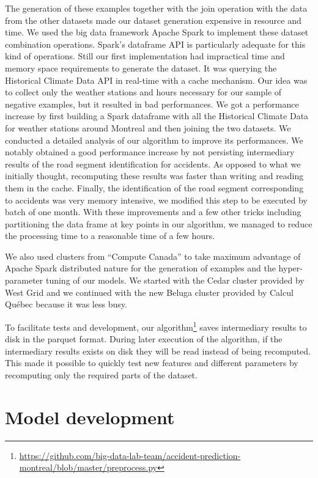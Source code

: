 \documentclass[conference]{IEEEtran}
\begin{document}
The generation of these examples together with the
join operation with the data from the other datasets made our dataset
generation expensive in resource and time. We used the big data framework
Apache Spark \cite{Zaharia2016} to implement these dataset combination
operations. Spark's dataframe API is particularly adequate
for this kind of operations. Still our first implementation had impractical
time and memory space requirements to generate the dataset. It was querying
the Historical Climate Data API in real-time with a cache mechanism. Our
idea was to collect only the weather stations and hours necessary for our
sample of negative examples, but it resulted in bad performances. We got a
performance increase by first building a Spark dataframe with all the
Historical Climate Data for weather stations around Montreal and then
joining the two datasets. We conducted a detailed analysis of our algorithm
to improve its performances. We notably obtained a good performance
increase by not persisting intermediary results of the road segment
identification for accidents. As opposed to what we initially thought,
recomputing these results was faster than writing and reading them in the
cache. Finally, the identification of the road segment corresponding to
accidents was very memory intensive, we modified this step to be executed
by batch of one month. With these improvements and a few other tricks
including partitioning the data frame at key points in our algorithm, we
managed to reduce the processing time to a reasonable time of a few hours.

We also used clusters from “Compute Canada” to take maximum advantage of Apache Spark distributed nature for the generation of examples and the hyper-parameter tuning of our models. We started with the Cedar cluster provided by West Grid and we continued with the new Beluga cluster provided by Calcul Québec because it was less busy.

To facilitate tests and development, our algorithm\footnote{\url{https://github.com/big-data-lab-team/accident-prediction-montreal/blob/master/preprocess.py}} saves intermediary results to disk in the parquet format. During later execution of the algorithm, if the intermediary results exists on disk they will be read instead of being recomputed. This made it possible to quickly test new features and different parameters by recomputing only the required parts of the dataset.

\section{Model development}
\end{document}
